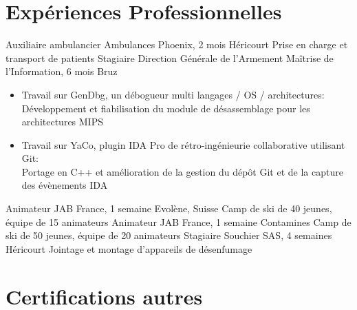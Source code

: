 \documentclass[10pt,sans]{moderncv}
\begin{document}

	\vspace*{\deletedSpace}
	\section{Expériences Professionnelles}
			{Auxiliaire ambulancier}
			{Ambulances Phoenix, 2 mois}
			{Héricourt}
			{Prise en charge et transport de patients}
			{}
			{Stagiaire}
			{Direction Générale de l'Armement Maîtrise de l'Information, 6 mois}
			{Bruz}
			{}
			{}
			\vspace{-5pt}
			\begin{itemize}
				\item Travail sur GenDbg, un débogueur multi langages / OS / architectures:\\
					\phantom{=}Développement et fiabilisation du module de désassemblage pour les architectures MIPS
				\item Travail sur YaCo, plugin IDA Pro de rétro-ingénieurie collaborative utilisant Git:\\
					\phantom{=}Portage en C++ et amélioration de la gestion du dépôt Git et de la capture des évènements IDA
			\end{itemize}
			\vspace{5pt}
			{Animateur}
			{JAB France, 1 semaine}
			{Evolène, Suisse}
			{Camp de ski de 40 jeunes, équipe de 15 animateurs}
			{}
			{Animateur}
			{JAB France, 1 semaine}
			{Contamines}
			{Camp de ski de 50 jeunes, équipe de 20 animateurs}
			{}
			{Stagiaire}
			{Souchier SAS, 4 semaines}
			{Héricourt}
			{Jointage et montage d'appareils de désenfumage}
			{}


	\vspace*{\deletedSpace}
	\section{Certifications autres}
\end{document}
